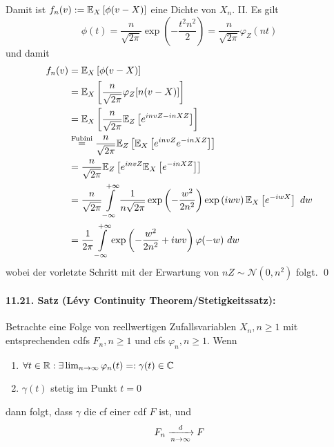 \documentclass[11pt]{report}
\begin{document}
Damit ist $f_n(v):=\mathbb{E}_X\left[\phi(v-X)\right]$ eine Dichte von $X_n$.\newline\newline
II. Es gilt 
$$\phi(t)=\dfrac{n}{\sqrt{2\pi}}\exp\left(-\dfrac{t^2n^2}{2}\right)=\dfrac{n}{\sqrt{2\pi}}\varphi_Z(nt)$$
und damit 
\begin{align*}
    f_n(v)&=\E_X\left[\phi(v-X)\right]\\
    &=\E_X\left[\dfrac{n}{\sqrt{2\pi}}\varphi_Z[n(v-X)]\right] \\
    &=\E_X\left[\dfrac{n}{\sqrt{2\pi}}\E_Z\left[e^{invZ-inXZ}\right]\right]\\
    &\overset{\text{Fubini}}{=}\dfrac{n}{\sqrt{2\pi}}\E_Z\left[\E_X\left[e^{invZ}e^{-inXZ}\right]\right]\\
    &=\dfrac{n}{\sqrt{2\pi}}\E_Z\left[e^{invZ}\E_X\left[e^{-inXZ}\right]\right] \\
    &=\dfrac{n}{\sqrt{2\pi}}\int\displaylimits_{-\infty}^{+\infty}\dfrac{1}{n\sqrt{2\pi}}\exp\left(-\dfrac{w^2}{2n^2}\right)\exp\left(iwv\right)\E_X\left[e^{-iwX}\right] \ dw \\
    &=\dfrac{1}{2\pi}\int\displaylimits_{-\infty}^{+\infty}\exp\left(-\dfrac{w^2}{2n^2}+iwv\right)\varphi(-w)\ dw
\end{align*}
wobei der vorletzte Schritt mit der Erwartung von $nZ\sim\mathcal{N}(0,n^2)$ folgt. \qed

\paragraph{11.21. Satz (L\'evy Continuity Theorem/Stetigkeitssatz):} Betrachte eine Folge von reellwertigen Zufallsvariablen $X_n,n\geq1$ mit entsprechenden cdfs $F_n,n\geq1$ und cfs $\varphi_n,n\geq1$. Wenn
\begin{enumerate}[label=(\roman*)]
    \item $\forall t\in\mathbb{R}: \exists\lim_{n\to\infty}\varphi_n(t)=:\gamma(t)\in\mathbb{C}$
    \item $\gamma(t)$ stetig im Punkt $t=0$
\end{enumerate}
dann folgt, dass $\gamma$ die cf einer cdf $F$ ist, und
$$F_n\nto{d}{n\to\infty}F$$

\end{document}
